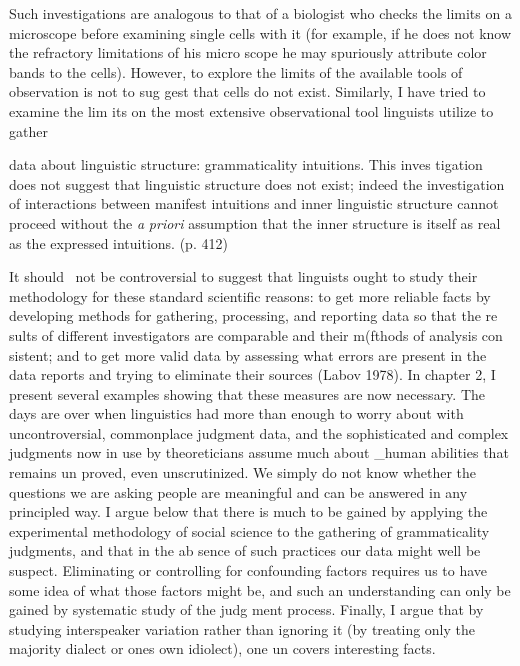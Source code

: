 \begin{styleStandard}
Such investigations are analogous to that of a biologist who checks the limits on a microscope before examining single cells with it (for example, if he does not know the refractory limitations of his micro\- scope he may spuriously attribute color bands to the cells). However, to explore the limits of the available tools of observation is not to sug\- gest that cells do not exist. Similarly, I have tried to examine the lim\- its on the most extensive observational tool linguists utilize to gather
\end{styleStandard}


\clearpage\setcounter{page}{1}\begin{styleTextbody}
data about linguistic structure: grammaticality intuitions. This inves\- tigation does not suggest that linguistic structure does not exist; indeed the investigation of interactions between manifest intuitions and inner linguistic structure cannot proceed without the \textit{a}\textit{ }\textit{priori}\textit{ }assumption that the inner structure is itself as {\textquotedbl}real{\textquotedbl} as the expressed intuitions. (p. 412)
\end{styleTextbody}


\begin{styleTextbody}
It should \ not be controversial to suggest that linguists ought to study their methodology for these standard scientific reasons: to get more reliable facts by developing methods for gathering, processing, and reporting data so that the re\- sults of different investigators are comparable and their m(fthods of analysis con\- sistent; and to get more valid data by assessing what errors are present in the data reports and trying to eliminate their sources (Labov 1978). In chapter 2, I present several examples showing that these measures are now necessary. The days are over when linguistics had more than enough to worry about with uncontroversial, commonplace judgment data, and the sophisticated and complex judgments now in use by theoreticians assume much about \_human abilities that remains un\- proved, even unscrutinized. We simply do not know whether the questions we are asking people are meaningful and can be answered in any principled way. I argue below that there is much to be gained by applying the experimental methodology of social science to the gathering of grammaticality judgments, and that in the ab\- sence of such practices our data might well be suspect. Eliminating or controlling for confounding factors requires us to have some idea of what those factors might be, and such an understanding can only be gained by systematic study of the judg\- ment process. Finally, I argue that by studying interspeaker variation rather than ignoring it (by treating only the majority dialect or one{\textquotesingle}s own idiolect), one un\- covers interesting facts.
\end{styleTextbody}


